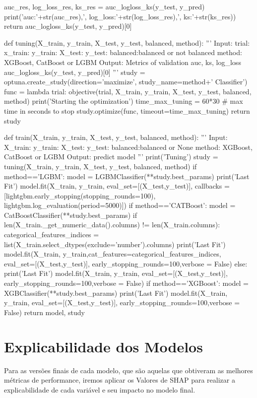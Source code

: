 \begin{codigo}[caption={Código implementado para o Tuning com o Optuna.}, label={codigo:im:tuning}, language=Python, breaklines=true]
    auc_res, log_loss_res, ks_res = auc_logloss_ks(y_test, y_pred)
    print('auc:'+str(auc_res),', log_loss:'+str(log_loss_res),', ks:'+str(ks_res))
    return auc_logloss_ks(y_test, y_pred)[0]

def tuning(X_train, y_train, X_test, y_test, balanced, method):
    '''
    Input:
        trial: 
        x_train:
        y_train:
        X_test:
        y_test:
        balanced:balanced or not balanced
        method: XGBoost, CatBoost or LGBM
    Output: Metrics of validation
        auc, ks, log_loss
        auc_logloss_ks(y_test, y_pred)[0]
    '''
    study = optuna.create_study(direction='maximize', study_name=method+' Classifier')
    func = lambda trial: objective(trial, X_train, y_train, X_test, y_test, balanced, method)
    print('Starting the optimization')
    time_max_tuning = 60*30 # max time in seconds to stop
    study.optimize(func, timeout=time_max_tuning)
    return study

def train(X_train, y_train, X_test, y_test, balanced, method):
    '''
    Input:
        X_train:
        y_train:
        X_test:
        y_test:
        balanced:balanced or None
        method: XGBoost, CatBoost or LGBM
    Output: predict model
    '''
    print('Tuning')
    study = tuning(X_train, y_train, X_test, y_test, balanced, method)
    if method=='LGBM':
        model = LGBMClassifier(**study.best_params)
        print('Last Fit')
        model.fit(X_train, y_train, eval_set=[(X_test,y_test)],
                 callbacks = [lightgbm.early_stopping(stopping_rounds=100), lightgbm.log_evaluation(period=5000)])
    if method=='CATBoost':
        model = CatBoostClassifier(**study.best_params)
        if len(X_train._get_numeric_data().columns) != len(X_train.columns):
            categorical_features_indices = list(X_train.select_dtypes(exclude='number').columns)
            print('Last Fit')
            model.fit(X_train, y_train,cat_features=categorical_features_indices, eval_set=[(X_test,y_test)],
                 early_stopping_rounds=100,verbose = False)
        else:
            print('Last Fit')
            model.fit(X_train, y_train, eval_set=[(X_test,y_test)],
                 early_stopping_rounds=100,verbose = False)
    if method=='XGBoost':
        model = XGBClassifier(**study.best_params)
        print('Last Fit')
        model.fit(X_train, y_train, eval_set=[(X_test,y_test)],
                 early_stopping_rounds=100,verbose = False)
    return model, study
\end{codigo}

\section{Explicabilidade dos Modelos}
Para as versões finais de cada modelo, que são aquelas que obtiveram as melhores métricas de performance, iremos aplicar os Valores de SHAP para realizar a explicabilidade de cada variável e seu impacto no modelo final.

